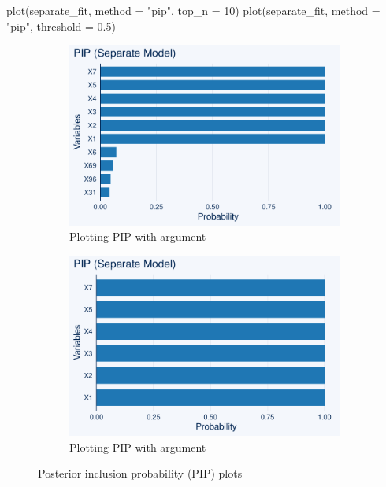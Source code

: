 \begin{example}
plot(separate_fit, method = "pip", top_n = 10)
plot(separate_fit, method = "pip", threshold = 0.5)
\end{example}

\begin{figure}[htbp]
\begin{subfigure}{0.5\textwidth}
\includegraphics[width=\linewidth]{fig/PIP_top_n.pdf}
\caption{Plotting PIP with  argument}
\end{subfigure}%
\begin{subfigure}{0.5\textwidth}
\includegraphics[width=\linewidth]{fig/PIP_threshold.pdf}
\caption{Plotting PIP with  argument}
\end{subfigure}
\caption{Posterior inclusion probability (PIP) plots}\label{fig:pip}
\end{figure}


